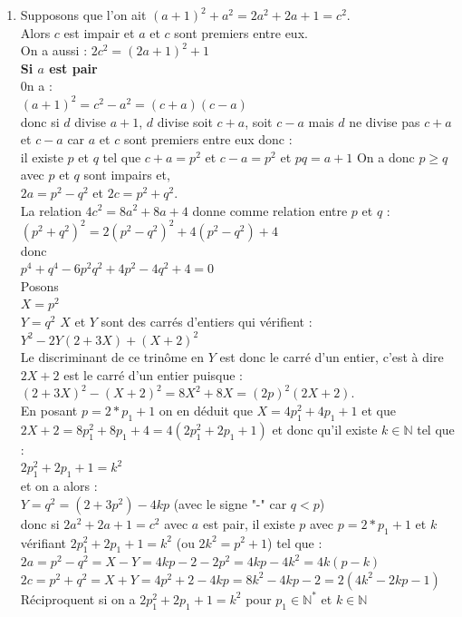 \documentclass[a4paper,11pt]{book}
\newcommand{\N}{{\mathbb{N}}}
\begin{document}
\begin{enumerate}
\item
Supposons que l'on ait $(a+1)^2+a^2=2a^2+2a+1=c^2$.\\
Alors $c$ est impair et $a$ et $c$ sont premiers entre eux.\\
On a aussi : $2c^2=(2a+1)^2+1$\\
{\bf Si $a$ est pair}\\
0n a :\\
$(a+1)^2=c^2-a^2=(c+a)(c-a)$\\
donc si $d$ divise $a+1$, $d$ divise soit $c+a$, soit $c-a$ mais $d$ ne divise 
pas $c+a$ et $c-a$ car $a$ et $c$ sont premiers entre eux donc :\\
il existe $p$ et $q$ tel que  $c+a=p^2$ et $c-a=p^2$ et $pq=a+1$
On a donc $p\geq q$ avec $p$ et $q$ sont impairs et,\\
$2a=p^2-q^2$ et $2c=p^2+q^2$.\\
La relation $4c^2=8a^2+8a+4$ donne comme relation entre $p$ et $q$ :\\
$(p^2+q^2)^2=2(p^2-q^2)^2+4(p^2-q^2)+4$\\
donc\\
$p^4+q^4-6p^2q^2+4p^2-4q^2+4=0$\\
Posons\\
$X=p^2$\\
$Y=q^2$
$X$ et $Y$ sont des carr\'es d'entiers qui v\'erifient :\\
$Y^2-2Y(2+3X)+(X+2)^2$\\
Le discriminant de ce trin\^ome en $Y$ est donc le carr\'e d'un entier, c'est 
\`a dire $2X+2$ est le carr\'e d'un entier puisque :\\
$(2+3X)^2-(X+2)^2=8X^2+8X=(2p)^2(2X+2)$.\\
En posant $p=2*p_1+1$ on en d\'eduit que $X=4p_1^2+4p_1+1$ et que 
$2X+2=8p_1^2+8p_1+4=4(2p_1^2+2p_1+1)$ et donc qu'il existe 
$k \in \N$ tel que :\\
$2p_1^2+2p_1+1=k^2$\\
et on a alors :\\
$Y=q^2=(2+3p^2)-4kp$ (avec le signe "-" car $q< p$)\\
donc si $2a^2+2a+1=c^2$ avec $a$ est pair,  il existe $p$ avec $p=2*p_1+1$ et 
$k$ v\'erifiant $2p_1^2+2p_1+1=k^2$ (ou $2k^2=p^2+1$) tel que :\\
$2a=p^2-q^2=X-Y=4kp-2-2p^2=4kp-4k^2=4k(p-k)$\\
$2c=p^2+q^2=X+Y=4p^2+2-4kp=8k^2-4kp-2=2(4k^2-2kp-1)$\\
R\'eciproquent si on a $2p_1^2+2p_1+1=k^2$ pour $p_1 \in \N^*$ et $k \in \N$

\end{enumerate}
\end{document}
